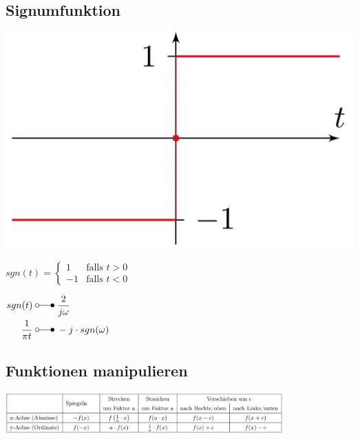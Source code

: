	\subsection{Signumfunktion }
		\begin{minipage}{0.2\textwidth}
			\includegraphics[width=\textwidth]{./bilder/funktionen/signF.png}
		\end{minipage}
		\qquad
		\begin{minipage}{0.45\textwidth}
			$sgn(t) = \begin{cases} 1 & \text{falls }t > 0 \\ -1 & \text{falls }t < 0 \end{cases}$
		\end{minipage}
		\qquad
		\begin{minipage}{0.25\textwidth}
            \begin{math}
                \begin{aligned}
                   sgn(t) \; &\laplace \; \frac{2}{j\omega}\\
                   \frac{1}{\pi t} \; &\laplace \; -j \cdot sgn(\omega)
                \end{aligned}
            \end{math}						
		\end{minipage}
	
	\subsection{Funktionen manipulieren}
		\includegraphics[width=0.8\textwidth]{./bilder/funktionen/SignalManip.png}	
	
